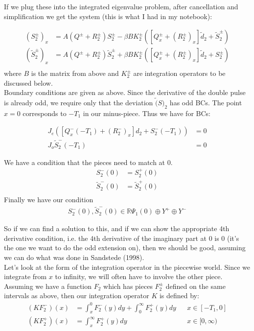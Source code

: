 \documentclass[12pt]{article}
\def\R{{\mathbb R}}
\begin{document}
If we plug these into the integrated eigenvalue problem, after cancellation and simplification we get the system (this is what I had in my notebook):

\begin{align*}
(S^\pm_2)_x &= A(Q^\pm + R^\pm_2) S^\pm_2 - \beta B K^\pm_2 ( [ Q^\pm_x + (R^\pm_2)_x]\tilde{d}_2 + \tilde{S}^\pm_2 ) \\
(\tilde{S}^\pm_2)_x &= A(Q^\pm + R^\pm_2) \tilde{S}^\pm_2 + \beta B K^\pm_2 ( [ Q^\pm_x + (R^\pm_2)_x]\tilde{d}_2 + S^\pm_2 ) \\
\end{align*}
where $B$ is the matrix from above and $K^\pm_2$ are integration operators to be discussed below. \\

Boundary conditions are given as above. Since the derivative of the double pulse is already odd, we require only that the deviation $\tilde(S)_2$ has odd BCs. The point $x = 0$ corresponds to $-T_1$ in our minus-piece. Thus we have for BCs:

\begin{align*}
J_e (  [Q^-_x(-T_1) + (R^-_2)_x]d_2 + S^-_2(-T_1) ) &= 0 \\
J_o \tilde{S}_2^-(-T_1) &= 0
\end{align*}

We have a condition that the pieces need to match at 0.
\begin{align*}
S^-_2(0) &= S^+_2(0) \\
\tilde{S}^-_2(0) &= \tilde{S}^+_2(0) \\
\end{align*}
Finally we have our condition
\begin{align*}
S^-_2(0), \tilde{S}^-_2(0) \in \R \Psi_1(0) \oplus Y^+ \oplus Y^-
\end{align*}

So if we can find a solution to this, and if we can show the appropriate 4th derivative condition, i.e. the 4th derivative of the imaginary part at 0 is 0 (it's the one we want to do the odd extension on), then we should be good, assuming we can do what was done in Sandstede (1998).\\

Let's look at the form of the integration operator in the piecewise world. Since we integrate from $x$ to infinity, we will often have to involve the other piece. Assuming we have a function $F_2$ which has pieces $F_2^\pm$ defined on the same intervals as above, then our integration operator $K$ is defined by:
\begin{align*}
(KF_2^-)(x) &= \int_x^0 F_2^-(y) dy + \int_0^\infty F_2^+(y) dy && x \in [-T_1, 0] \\
(KF_2^+)(x) &= \int_x^\infty F_2^+(y) dy && x \in [0, \infty)\\
\end{align*}
\end{document}
